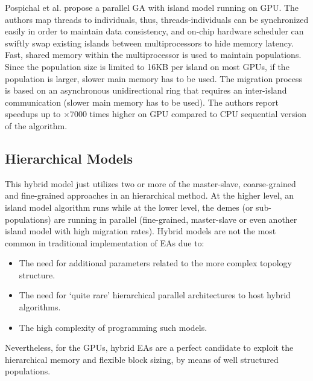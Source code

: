 \documentclass{comjnl}
\begin{document}
Pospichal et al. \cite{pospichalParallelGeneticAlgorithOnCUDA2010,9253} propose a parallel GA with island model running on GPU. The authors map threads to individuals, thus, threads-individuals can be synchronized easily in order to maintain data consistency, and on-chip hardware scheduler can swiftly swap existing islands between multiprocessors to hide memory latency. Fast, shared memory within the multiprocessor is used to maintain populations.
Since the population size is limited to 16KB per island on most GPUs, if the population is larger, slower main memory has to be used. The migration process is based on an asynchronous unidirectional ring that requires an inter-island communication (slower main memory has to be used). The authors report speedups up to $\times7000$ times higher on GPU compared to CPU sequential version of the algorithm.

\subsection{Hierarchical Models}

This hybrid model just utilizes two or more of the master-slave, coarse-grained and fine-grained approaches in an hierarchical method. At the higher level, an island model algorithm runs while at the lower level, the demes (or sub-populations) are running in parallel (fine-grained, master-slave or even another island model with high migration rates). Hybrid models are not the most common in traditional implementation of EAs due to:
\begin{itemize}
 \item The need for additional parameters related to the more complex topology structure. 
 \item The need for `quite rare' hierarchical parallel architectures to host hybrid algorithms. 
\item The high complexity of programming such models. 
\end{itemize}

Nevertheless, for the GPUs, hybrid EAs are a perfect candidate to exploit the hierarchical memory and flexible block sizing, by means of well structured populations. 
\end{document}
